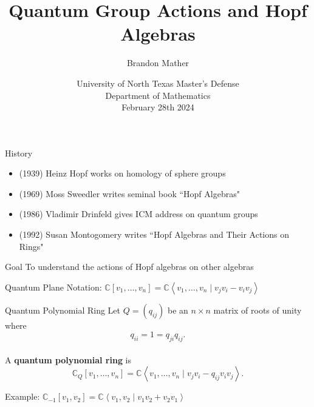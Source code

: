 \documentclass{beamer}
\title{Quantum Group Actions and Hopf Algebras}
\author{Brandon Mather}
\date{University of North Texas Master's Defense\\
Department of Mathematics \\February 28th 2024}
\newcommand\1{_{(1)}}
\newcommand\2{_{(2)}}
\begin{document}
\maketitle

\begin{frame}{History}
    \begin{itemize}\setlength{\itemindent}{-2ex}
        \item (1939) Heinz Hopf works on homology of sphere groups
        \item (1969) Moss Sweedler writes seminal book ``Hopf Algebras"
        \item (1986) Vladimir Drinfeld gives ICM address on quantum groups
        \item (1992) Susan Montogomery writes ``Hopf Algebras and Their Actions on Rings"
    \end{itemize}
    \begin{block}{Goal}
        To understand the actions of Hopf algebras on other algebras
    \end{block}
\end{frame}

\begin{frame}{Quantum Plane}
    Notation: $\mathbb{C}[v_1,\ldots,v_n]=\mathbb{C}\left\langle v_1,\ldots,v_n\;\vert\; v_jv_i-v_iv_j\right\rangle$
    \begin{block}{Quantum Polynomial Ring}
        Let $Q=(q_{ij})$ be an $n\times n$ matrix of roots of unity where \[q_{ii}=1=q_{ji}q_{ij}.\]
        \\
        A \textbf{quantum polynomial ring} is \[\mathbb{C}_Q[v_1,\ldots,v_n]=\mathbb{C}\left\langle v_1,\ldots,v_n \;\vert\; v_jv_i-q_{ij}v_iv_j\right\rangle.\]
    \end{block}
    Example: $\mathbb{C}_{-1}[v_1,v_2]=\mathbb{C}\left\langle v_1,v_2\;\vert\; v_1 v_2+v_2 v_1\right\rangle$
\end{frame}
\end{document}
